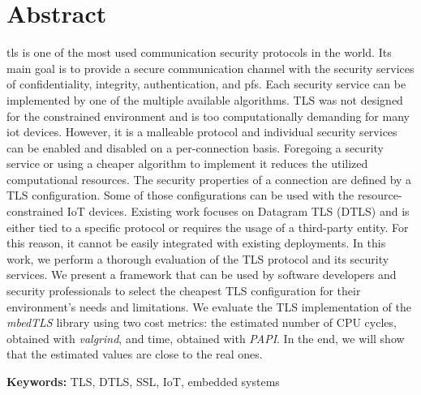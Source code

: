 
\section*{Abstract}


\gls{tls} is one of the most used communication security protocols in the world. 
Its main goal is to provide a secure communication channel with the security services of confidentiality, 
integrity, authentication, and \gls{pfs}. Each security service can be implemented by one of the multiple available algorithms. 
TLS was not designed for the constrained environment and is too computationally demanding for many \gls{iot} devices. 
However, it is a malleable protocol and individual security services can be enabled and disabled on a per-connection basis. 
Foregoing a security service or using a cheaper algorithm to implement it reduces the utilized computational resources. 
The security properties of a connection are defined by a TLS configuration. Some of those configurations can be used with the 
resource-constrained IoT devices. Existing work focuses on Datagram TLS (DTLS) and is either tied to a specific protocol or requires 
the usage of a third-party entity. For this reason, it cannot be easily integrated with existing deployments. In this work, we 
perform a thorough evaluation of the TLS protocol and its security services. We present a framework that can be used by software developers 
and security professionals to select the cheapest TLS configuration for their environment's needs and limitations. 
We evaluate the TLS implementation of the \textit{mbedTLS} library using two cost metrics: the estimated number of CPU cycles, 
obtained with \textit{valgrind}, and time, obtained with \textit{PAPI}. In the end, we will show that the estimated values are close to the real ones.

\vfill

\textbf{\Large Keywords:} TLS, DTLS, SSL, IoT, embedded systems

